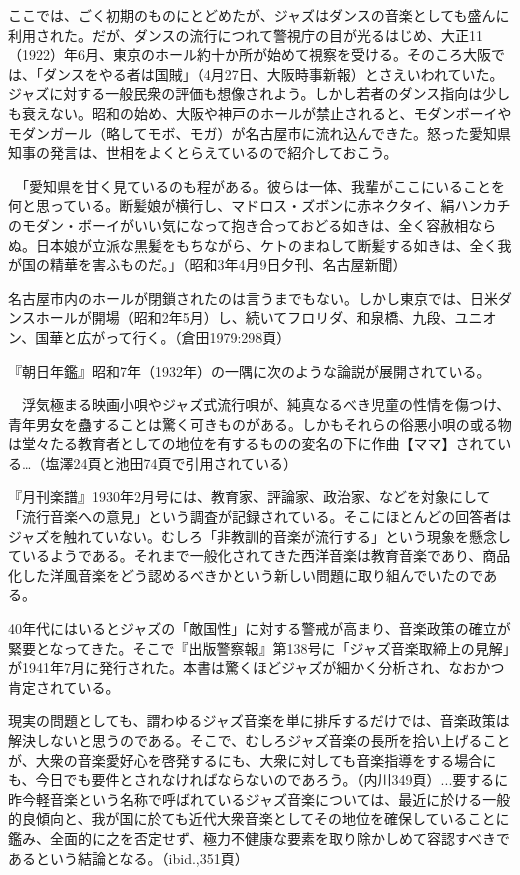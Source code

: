 ここでは、ごく初期のものにとどめたが、ジャズはダンスの音楽としても盛んに利用された。だが、ダンスの流行につれて警視庁の目が光るはじめ、大正11（1922）年6月、東京のホール約十か所が始めて視察を受ける。そのころ大阪では、「ダンスをやる者は国賊」（4月27日、大阪時事新報）とさえいわれていた。ジャズに対する一般民衆の評価も想像されよう。しかし若者のダンス指向は少しも衰えない。昭和の始め、大阪や神戸のホールが禁止されると、モダンボーイやモダンガール（略してモボ、モガ）が名古屋市に流れ込んできた。怒った愛知県知事の発言は、世相をよくとらえているので紹介しておこう。

\begin{gquote}
　「愛知県を甘く見ているのも程がある。彼らは一体、我輩がここにいることを何と思っている。断髪娘が横行し、マドロス・ズボンに赤ネクタイ、絹ハンカチのモダン・ボーイがいい気になって抱き合っておどる如きは、全く容赦相ならぬ。日本娘が立派な黒髪をもちながら、ケトのまねして断髪する如きは、全く我が国の精華を害ふものだ。」（昭和3年4月9日夕刊、名古屋新聞）
\end{gquote}

名古屋市内のホールが閉鎖されたのは言うまでもない。しかし東京では、日米ダンスホールが開場（昭和2年5月）し、続いてフロリダ、和泉橋、九段、ユニオン、国華と広がって行く。（倉田1979:298頁）

『朝日年鑑』昭和7年（1932年）の一隅に次のような論説が展開されている。

\begin{gquote}
　浮気極まる映画小唄やジャズ式流行唄が、純真なるべき児童の性情を傷つけ、青年男女を蠱することは驚く可きものがある。しかもそれらの俗悪小唄の或る物は堂々たる教育者としての地位を有するものの変名の下に作曲【ママ】されている…（塩澤24頁と池田74頁で引用されている）
\end{gquote}

『月刊楽譜』1930年2月号には、教育家、評論家、政治家、などを対象にして「流行音楽への意見」という調査が記録されている。そこにほとんどの回答者はジャズを触れていない。むしろ「非教訓的音楽が流行する」という現象を懸念しているようである。それまで一般化されてきた西洋音楽は教育音楽であり、商品化した洋風音楽をどう認めるべきかという新しい問題に取り組んでいたのである。

40年代にはいるとジャズの「敵国性」に対する警戒が高まり、音楽政策の確立が緊要となってきた。そこで『出版警察報』第138号に「ジャズ音楽取締上の見解」が1941年7月に発行された。本書は驚くほどジャズが細かく分析され、なおかつ肯定されている。

\begin{gquote}
現実の問題としても、謂わゆるジャズ音楽を単に排斥するだけでは、音楽政策は解決しないと思うのである。そこで、むしろジャズ音楽の長所を拾い上げることが、大衆の音楽愛好心を啓発するにも、大衆に対しても音楽指導をする場合にも、今日でも要件とされなければならないのであろう。（内川349頁）...要するに昨今軽音楽という名称で呼ばれているジャズ音楽については、最近に於ける一般的良傾向と、我が国に於ても近代大衆音楽としてその地位を確保していることに鑑み、全面的に之を否定せず、極力不健康な要素を取り除かしめて容認すべきであるという結論となる。（ibid.,351頁）
\end{gquote}

